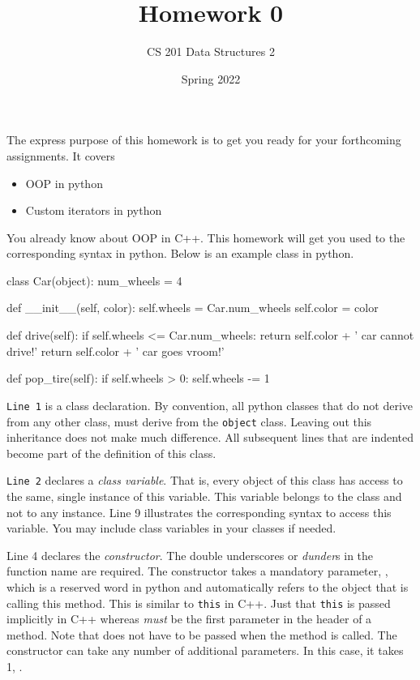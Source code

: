 \documentclass[a4paper]{exam}
\title{Homework 0}
\author{CS 201 Data Structures 2}
\date{Spring 2022}
\begin{document}
\maketitle

The express purpose of this homework is to get you ready for your forthcoming assignments. It covers
\begin{itemize}
\item OOP in python
\item Custom iterators in python
\end{itemize}

\begin{questions}

You already know about OOP in C++. This homework will get you used to the corresponding syntax in python. Below is an example class in python.

\begin{python}
class Car(object):
    num_wheels = 4

    def __init__(self, color):
        self.wheels = Car.num_wheels
        self.color = color

    def drive(self):
        if self.wheels <= Car.num_wheels:
            return self.color + ' car cannot drive!'
        return self.color + ' car goes vroom!'

    def pop_tire(self):
        if self.wheels > 0:
            self.wheels -= 1
\end{python}

\texttt{Line 1} is a class declaration. By convention, all python classes that do not derive from any other class, must derive from the \texttt{object} class. Leaving out this inheritance does not make much difference. All subsequent lines that are indented become part of the definition of this class.

\texttt{Line 2} declares a \textit{class variable}. That is, every object of this class has access to the same, single instance of this variable. This variable belongs to the class and not to any instance. Line 9 illustrates the corresponding syntax to access this variable. You may include class variables in your classes if needed.

Line 4 declares the \textit{constructor}. The double underscores or \textit{dunder}s in the function name are required. The constructor takes a mandatory parameter, , which is a reserved word in python and automatically refers to the object that is calling this method. This is similar to \texttt{this} in C++. Just that \texttt{this} is passed implicitly in C++ whereas  \textit{must} be the first parameter in the header of a method. Note that  does not have to be passed when the method is called. The constructor can take any number of additional parameters. In this case, it takes 1, .


\end{questions}
\end{document}
